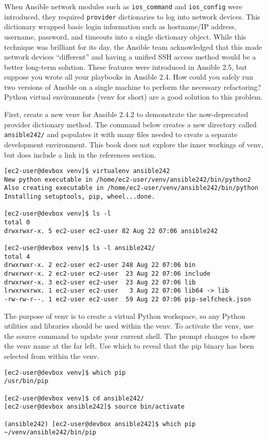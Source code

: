 When Ansible network modules such as \verb|ios_command| and \verb|ios_config| were
introduced, they required \verb|provider| dictionaries to log into network devices.
This dictionary wrapped basic login information such as hostname/IP address,
username, password, and timeouts into a single dictionary object. While this
technique was brilliant for its day, the Ansible team acknowledged that this
made network devices ``different'' and having a unified SSH access method would
be a better long-term solution. These features were introduced in Ansible 2.5,
but suppose you wrote all your playbooks in Ansible 2.4. How could you safely
run two versions of Ansible on a single machine to perform the necessary
refactoring? Python virtual environments (venv for short) are a good solution
to this problem.

First, create a new venv for Ansible 2.4.2 to demonstrate the now-deprecated
provider dictionary method. The command below creates a new directory called
\verb|ansible242/| and populates it with many files needed to create a separate
development environment. This book does not explore the inner workings of
venv, but does include a link in the references section.

\begin{verbatim}
[ec2-user@devbox venv]$ virtualenv ansible242
New python executable in /home/ec2-user/venv/ansible242/bin/python2
Also creating executable in /home/ec2-user/venv/ansible242/bin/python
Installing setuptools, pip, wheel...done.

[ec2-user@devbox venv]$ ls -l
total 0
drwxrwxr-x. 5 ec2-user ec2-user 82 Aug 22 07:06 ansible242

[ec2-user@devbox venv]$ ls -l ansible242/
total 4
drwxrwxr-x. 2 ec2-user ec2-user 248 Aug 22 07:06 bin
drwxrwxr-x. 2 ec2-user ec2-user  23 Aug 22 07:06 include
drwxrwxr-x. 3 ec2-user ec2-user  23 Aug 22 07:06 lib
lrwxrwxrwx. 1 ec2-user ec2-user   3 Aug 22 07:06 lib64 -> lib
-rw-rw-r--. 1 ec2-user ec2-user  59 Aug 22 07:06 pip-selfcheck.json
\end{verbatim}

The purpose of venv is to create a virtual Python workspace, so any Python
utilities and libraries should be used within the venv. To activate the venv,
use the source command to update your current shell. The prompt changes to
show the venv name at the far left. Use which to reveal that the pip binary
has been selected from within the venv.

\begin{verbatim}
[ec2-user@devbox venv]$ which pip
/usr/bin/pip

[ec2-user@devbox venv]$ cd ansible242/
[ec2-user@devbox ansible242]$ source bin/activate

(ansible242) [ec2-user@devbox ansible242]$ which pip
~/venv/ansible242/bin/pip
\end{verbatim}

